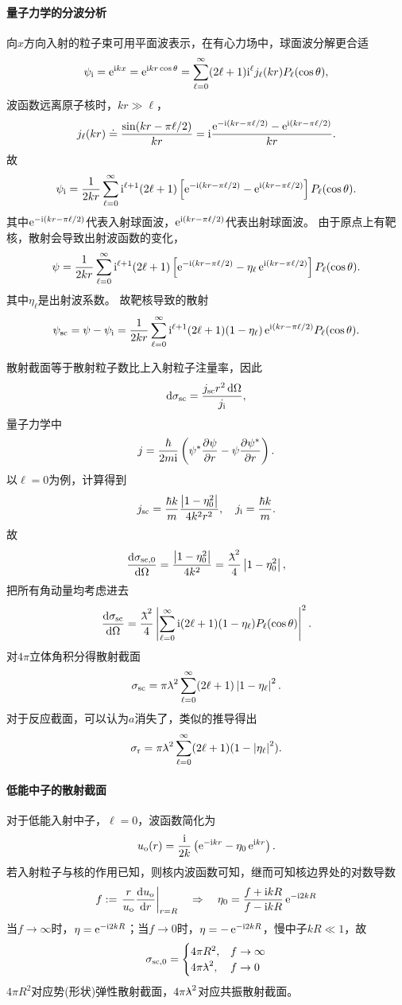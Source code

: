 \paragraph{量子力学的分波分析}
向$x$方向入射的粒子束可用平面波表示，在有心力场中，球面波分解更合适
\[
	\psi_{\mathrm{i}}=\mathop{}\!\mathrm{e}^{\mathrm{i} kx}=\mathop{}\!\mathrm{e}^{\mathrm{i} kr\cos\theta}=\sum_{\ell=0}^\infty(2\ell+1)\mathrm{i}^\ell j_\ell(kr)P_\ell(\cos\theta),
\]
波函数远离原子核时，$kr\gg\ell$，
\[
	j_\ell(kr)\doteq\frac{\sin(kr-\pi\ell/2)}{kr}=\mathrm{i}\frac{\mathop{}\!\mathrm{e}^{-\mathrm{i}(kr-\pi\ell/2)}-\mathop{}\!\mathrm{e}^{\mathrm{i}(kr-\pi\ell/2)}}{kr}.
\]
故
\[
	\psi_{\mathrm{i}}=\frac1{2kr}\sum_{\ell=0}^\infty\mathrm{i}^{\ell+1}(2\ell+1)\left[\mathop{}\!\mathrm{e}^{-\mathrm{i}(kr-\pi\ell/2)}-\mathop{}\!\mathrm{e}^{\mathrm{i}(kr-\pi\ell/2)}\right]P_\ell(\cos\theta).
\]
其中$\mathop{}\!\mathrm{e}^{-\mathrm{i}(kr-\pi\ell/2)}$代表入射球面波，$\mathop{}\!\mathrm{e}^{\mathrm{i}(kr-\pi\ell/2)}$代表出射球面波。
由于原点上有靶核，散射会导致出射波函数的变化，
\[
	\psi=\frac1{2kr}\sum_{\ell=0}^\infty\mathrm{i}^{\ell+1}(2\ell+1)\left[\mathop{}\!\mathrm{e}^{-\mathrm{i}(kr-\pi\ell/2)}-\eta_\ell\mathop{}\!\mathrm{e}^{\mathrm{i}(kr-\pi\ell/2)}\right]P_\ell(\cos\theta).
\]
其中$\eta_\ell$是出射波系数。
故靶核导致的散射
\begin{align}
	\psi_{\mathrm{sc}}=\psi-\psi_{\mathrm{i}}=\frac1{2kr}\sum_{\ell=0}^\infty\mathrm{i}^{\ell+1}(2\ell+1)(1-\eta_\ell)\mathop{}\!\mathrm{e}^{\mathrm{i}(kr-\pi\ell/2)}P_\ell(\cos\theta).
\end{align}

散射截面等于散射粒子数比上入射粒子注量率，因此
\[
	\mathop{}\!\mathrm{d}\sigma_{\mathrm{sc}}=\frac{j_{\mathrm{sc}} r^2\mathop{}\!\mathrm{d}\Omega}{j_{\mathrm{i}}},
\]
量子力学中
\[
	j=\frac{\hbar}{2m\i}\kh{\psi\cj\pv\psi{r}-\psi\pv{\psi\cj}r}.
\]
以$\ell=0$为例，计算得到
\[
	j_{\mathrm{sc}}=\frac{\hbar k}m\frac{\left\lvert1-\eta_0^2\right\rvert}{4k^2r^2},\quad j_{\mathrm{i}}=\frac{\hbar k}m.
\]
故
\[
	\dv{\sigma_{\mathrm{sc},0}}\Omega=\frac{\abs{1-\eta_0^2}}{4k^2}=\frac{\barlambda^2}4\abs{1-\eta_0^2},
\]
把所有角动量均考虑进去
\[
	\dv{\sigma_\sca}\Omega=\frac{\barlambda^2}4\abs{\sum_{\ell=0}^\infty\i(2\ell+1)(1-\eta_\ell)P_\ell(\cos\theta)}^2.
\]
对$4\pi$立体角积分得散射截面
\begin{align}
	\sigma_{\mathrm{sc}}=\pi{^{_-}\!\!\!\!\lambda}^2\sum_{\ell=0}^\infty(2\ell+1)\left\lvert1-\eta_\ell\right\rvert^2.
\end{align}
对于反应截面，可以认为$a$消失了，类似的推导得出
\[
	\sigma_{\mathrm{r}}=\pi{^{_-}\!\!\!\!\lambda}^2\sum_{\ell=0}^\infty(2\ell+1)(1-\left\lvert\eta_\ell\right\rvert^2).
\]

\paragraph{低能中子的散射截面}对于低能入射中子，$\ell=0$，波函数简化为 
\[
	u_{\mathrm o}(r)=\frac{\mathrm{i}}{2k}\left(\mathop{}\!\mathrm{e}^{-\mathrm{i} kr}-\eta_0\mathop{}\!\mathrm{e}^{\mathrm{i} kr}\right).
\]
若入射粒子与核的作用已知，则核内波函数可知，继而可知核边界处的对数导数
\[
	f:=\left.\frac r{u_{\mathrm o}}\frac{\mathrm{d}^{\;\!\!}u_{\mathrm o}}{\mathrm{d} r^{\;\!\!}}\right\rvert_{r=R}\quad\Rightarrow\quad\eta_0=\frac{f+\mathrm{i} kR}{f-\mathrm{i} kR}\mathop{}\!\mathrm{e}^{-\mathrm{i}2kR}
\]
当$f\to\infty$时，$\eta=\mathop{}\!\mathrm{e}^{-\mathrm{i}2kR}$；当$f\to0$时，$\eta=-\mathop{}\!\mathrm{e}^{-\mathrm{i}2kR}$，慢中子$kR\ll 1$，故 
\begin{align}
	\sigma_{\mathrm{sc},0}=\begin{cases}
		4\pi R^2,&f\to\infty\\
		4\pi{^{_-}\!\!\!\!\lambda}^2,&f\to0
	\end{cases}
\end{align}
$4\pi R^2$对应势(形状)弹性散射截面，$4\pi{^{_-}\!\!\!\!\lambda}^2$对应共振散射截面。
